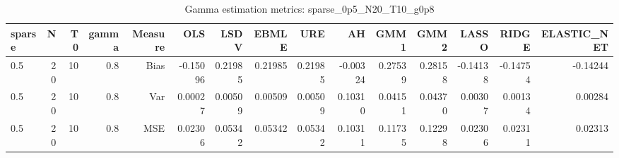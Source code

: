 \begin{table}[!htbp]\centering
\caption{Gamma estimation metrics: sparse_0p5_N20_T10_g0p8}
\label{tab:table1_sparse_0p5_N20_T10_g0p8}
\begin{tabular}{lrrrrrrrrrrrrrr}
\hline
sparse & N & T0 & gamma & Measure & OLS & LSDV & EBMLE & URE & AH & GMM1 & GMM2 & LASSO & RIDGE & ELASTIC_NET \\
\hline
0.5 & 20 & 10 & 0.8 & Bias & -0.15096 & 0.21985 & 0.21985 & 0.21985 & -0.00324 & 0.27539 & 0.28158 & -0.14138 & -0.14754 & -0.14244 \\
0.5 & 20 & 10 & 0.8 & Var & 0.00027 & 0.00509 & 0.00509 & 0.00509 & 0.10310 & 0.04151 & 0.04370 & 0.00307 & 0.00134 & 0.00284 \\
0.5 & 20 & 10 & 0.8 & MSE & 0.02306 & 0.05342 & 0.05342 & 0.05342 & 0.10311 & 0.11735 & 0.12298 & 0.02306 & 0.02311 & 0.02313 \\
\hline
\end{tabular}
\end{table}

